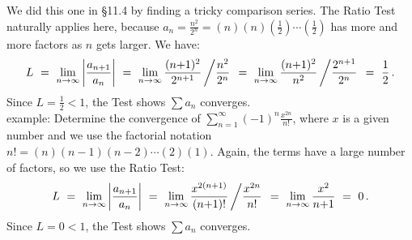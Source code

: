 \documentclass[11pt]{article}
\newcommand{\ds}{\displaystyle}
\begin{document}
We did this one in \S11.4 by finding a tricky comparison series. The Ratio Test naturally applies here,
 because $a_n= \frac{n^2}{2^n}=(n)(n)(\frac12)\cdots(\frac12)$ has more and more factors as $n$ gets larger.
We have:
$$
L\ =\
\lim_{n\to\infty} \left|\frac{a_{n+1}}{a_n}\right|
\ =\
\lim\limits_{n\to\infty} 
\frac{(n{+}1)^2}{2^{n+1}}\left/
\frac{n^2}{2^n}
\right.
\ =\
\lim_{n\to\infty}
\frac{(n{+}1)^2}{n^2}\left/
\frac{2^{n+1}}{2^n}
\right.
\ =\
\frac12\,.
$$
Since $L=\frac12<1$, the Test shows $\sum a_n$ converges.
\\[.5em]
 {\sc example:} Determine the convergence of $\ds\sum_{n=1}^\infty (-1)^n\frac{x^{2n}}{n!}$, where $x$ is a given number and 
 we use the factorial notation $n! = (n)(n{-}1)(n{-}2)\cdots (2)(1)$. 
Again, the terms have a large number of factors, so we use the Ratio Test:
$$
L\ =\
\lim_{n\to\infty} \left|\frac{a_{n+1}}{a_n}\right|
\ =\
\lim\limits_{n\to\infty} 
\frac{x^{2(n+1)}}{(n{+}1)!}\left/
\frac{x^{2n}}{n!}
\right.
\ =\
\lim\limits_{n\to\infty} \frac{x^2}{n{+}1}
\ =\ 0\,.
$$
Since $L = 0<1$, the Test shows $\sum a_n$ converges.
\end{document}
